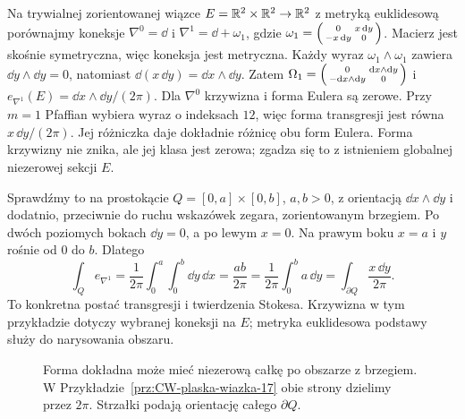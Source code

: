 \begin{przyklad}
\label{prz:CW-plaska-wiazka-17}
Na trywialnej zorientowanej wiązce $E=\mathbb{R}^2\times\mathbb{R}^2\to\mathbb{R}^2$
z metryką euklidesową porównajmy koneksje
$\nabla^0=\dd$ i $\nabla^1=\dd+\omega_1$, gdzie
$\omega_1=\begin{psmallmatrix}0&x\,\mathrm d y\\-x\,\mathrm d y&0\end{psmallmatrix}$.
Macierz jest skośnie symetryczna, więc koneksja jest metryczna.
Każdy wyraz $\omega_1\wedge\omega_1$ zawiera
$\dd y\wedge\dd y=0$, natomiast $\dd(x\,\dd y)=\dd x\wedge\dd y$.
Zatem $\Omega_1=
\begin{psmallmatrix}0&\mathrm d x\wedge\mathrm d y\\-\mathrm d x\wedge\mathrm d y&0\end{psmallmatrix}$
i $e_{\nabla^1}(E)=\dd x\wedge\dd y/(2\pi)$.
Dla $\nabla^0$ krzywizna i forma Eulera są zerowe.
Przy $m=1$ Pfaffian wybiera wyraz o indeksach $12$,
więc forma transgresji jest równa $x\,\dd y/(2\pi)$.
Jej różniczka daje dokładnie różnicę obu form Eulera.
Forma krzywizny nie znika, ale jej klasa jest zerowa;
zgadza się to z istnieniem globalnej niezerowej sekcji $E$.

Sprawdźmy to na prostokącie $Q=[0,a]\times[0,b]$, $a,b>0$,
z orientacją $\dd x\wedge\dd y$ i dodatnio, przeciwnie do
ruchu wskazówek zegara, zorientowanym brzegiem.
Po dwóch poziomych bokach $\dd y=0$, a po lewym $x=0$.
Na prawym boku $x=a$ i $y$ rośnie od $0$ do $b$.
Dlatego
\[
 \int_Q e_{\nabla^1}
 =\frac1{2\pi}\int_0^a\int_0^b\dd y\,\dd x
 =\frac{ab}{2\pi}
 =\frac1{2\pi}\int_0^b a\,\dd y
 =\int_{\partial Q}\frac{x\,\dd y}{2\pi}.
\]
To konkretna postać transgresji i twierdzenia Stokesa.
Krzywizna w tym przykładzie dotyczy wybranej koneksji
na $E$; metryka euklidesowa podstawy służy do narysowania obszaru.
\end{przyklad}

\begin{figure}[htbp]
\centering
{}
\caption{Forma dokładna może mieć niezerową całkę po obszarze
z brzegiem. W Przykładzie~\ref{prz:CW-plaska-wiazka-17}
obie strony dzielimy przez $2\pi$.
Strzałki podają orientację całego $\partial Q$.}
\label{fig:CW-transgresja-prostokat}
\end{figure}

